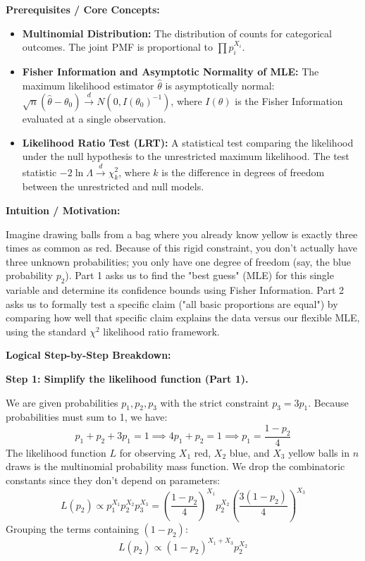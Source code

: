 \begin{solution}
\textbf{Prerequisites / Core Concepts:}
\begin{itemize}
    \item \textbf{Multinomial Distribution:} The distribution of counts for categorical outcomes. The joint PMF is proportional to $\prod p_i^{X_i}$.
    \item \textbf{Fisher Information and Asymptotic Normality of MLE:} The maximum likelihood estimator $\hat{\theta}$ is asymptotically normal: $\sqrt{n}(\hat{\theta} - \theta_0) \xrightarrow{d} N(0, I(\theta_0)^{-1})$, where $I(\theta)$ is the Fisher Information evaluated at a single observation.
    \item \textbf{Likelihood Ratio Test (LRT):} A statistical test comparing the likelihood under the null hypothesis to the unrestricted maximum likelihood. The test statistic $-2 \ln \Lambda \xrightarrow{d} \chi^2_k$, where $k$ is the difference in degrees of freedom between the unrestricted and null models.
\end{itemize}

\textbf{Intuition / Motivation:}

Imagine drawing balls from a bag where you already know yellow is exactly three times as common as red. Because of this rigid constraint, you don't actually have three unknown probabilities; you only have one degree of freedom (say, the blue probability $p_2$). Part 1 asks us to find the "best guess" (MLE) for this single variable and determine its confidence bounds using Fisher Information. Part 2 asks us to formally test a specific claim ("all basic proportions are equal") by comparing how well that specific claim explains the data versus our flexible MLE, using the standard $\chi^2$ likelihood ratio framework.

\textbf{Logical Step-by-Step Breakdown:}

\textbf{Step 1: Simplify the likelihood function (Part 1).}

We are given probabilities $p_1, p_2, p_3$ with the strict constraint $p_3 = 3p_1$.
Because probabilities must sum to 1, we have:
\[ p_1 + p_2 + 3p_1 = 1 \implies 4p_1 + p_2 = 1 \implies p_1 = \frac{1-p_2}{4} \]
The likelihood function $L$ for observing $X_1$ red, $X_2$ blue, and $X_3$ yellow balls in $n$ draws is the multinomial probability mass function. We drop the combinatoric constants since they don't depend on parameters:
\[ L(p_2) \propto p_1^{X_1} p_2^{X_2} p_3^{X_3} = \left(\frac{1-p_2}{4}\right)^{X_1} p_2^{X_2} \left(\frac{3(1-p_2)}{4}\right)^{X_3} \]
Grouping the terms containing $(1-p_2)$:
\[ L(p_2) \propto (1-p_2)^{X_1+X_3} p_2^{X_2} \]


\end{solution}
